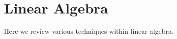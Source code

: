 \newpage
\chapter{Linear Algebra}
\label{app:lin-alg}
Here we review various techniques within linear algebra.

